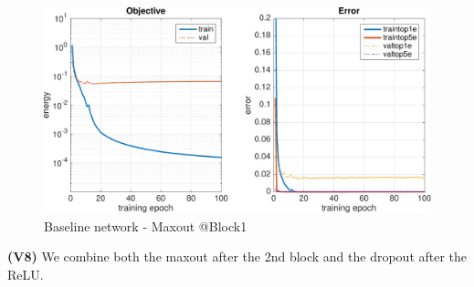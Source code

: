 \documentclass[11pt]{article}
\begin{document}
	\begin{figure}[H]
	    \centering
	    \includegraphics[width=15cm]{v7}
	    \caption{Baseline network - Maxout @Block1}
	\end{figure}


\textbf{(V8)} We combine both the maxout after the 2nd block and the dropout after the ReLU.
	
\end{document}
